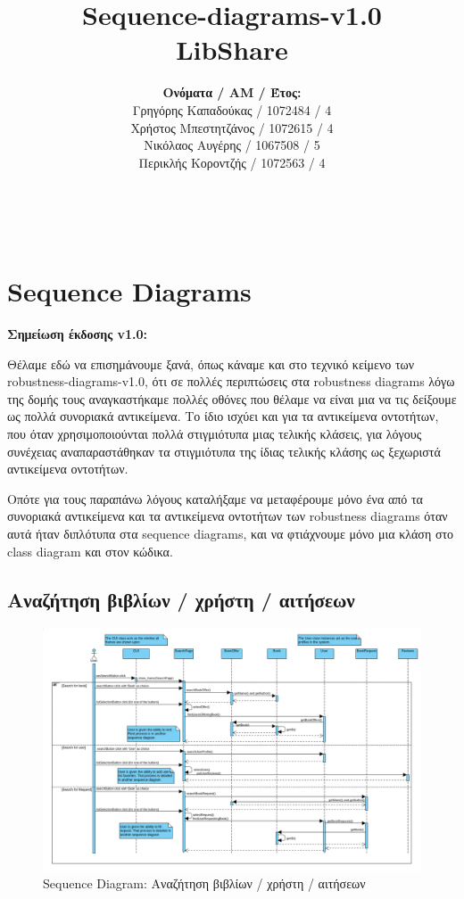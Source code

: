 \documentclass[12pt,a4paper]{article}
\title{Sequence-diagrams-v1.0 \\ LibShare}
\author{\textbf{Ονόματα / ΑΜ / Έτος:} \\ Γρηγόρης Καπαδούκας / 1072484 / 4\textdegree \\ Χρήστος Μπεστητζάνος / 1072615 / 4\textdegree \\ Νικόλαος Αυγέρης / 1067508 / 5\textdegree \\ Περικλής Κοροντζής / 1072563 / 4\textdegree}
\begin{document}
\makeatletter
\begin{center}
	\LARGE{\@title} \\
	\pagebreak
    \begin{LARGE}\@author\end{LARGE}
    \pagebreak
\end{center}

\section{Sequence Diagrams}

\textbf{Σημείωση έκδοσης v1.0:}

Θέλαμε εδώ να επισημάνουμε ξανά, όπως κάναμε και στο τεχνικό κείμενο των robustness-diagrams-v1.0, ότι σε πολλές περιπτώσεις στα robustness diagrams λόγω της δομής τους αναγκαστήκαμε πολλές οθόνες που θέλαμε να είναι μια να τις δείξουμε ως πολλά συνοριακά αντικείμενα. Το ίδιο ισχύει και για τα αντικείμενα οντοτήτων, που όταν χρησιμοποιούνται πολλά στιγμιότυπα μιας τελικής κλάσεις, για λόγους συνέχειας αναπαραστάθηκαν τα στιγμιότυπα της ίδιας τελικής κλάσης ως ξεχωριστά αντικείμενα οντοτήτων.

Οπότε για τους παραπάνω λόγους καταλήξαμε να μεταφέρουμε μόνο ένα από τα συνοριακά αντικείμενα και τα αντικείμενα οντοτήτων των robustness diagrams όταν αυτά ήταν διπλότυπα στα sequence diagrams, και να φτιάχνουμε μόνο μια κλάση στο class diagram και στον κώδικα.

\subsection{Αναζήτηση βιβλίων / χρήστη / αιτήσεων}
\begin{figure}[H]
	\includegraphics[width=\textwidth]{Search Sequence.png}
	\caption{Sequence Diagram: Αναζήτηση βιβλίων / χρήστη / αιτήσεων}
	\label{Sequence Diagram: Αναζήτηση βιβλίων / χρήστη / αιτήσεων}
\end{figure}
\end{document}

